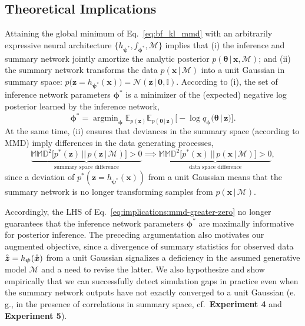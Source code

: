 \documentclass[twoside,11pt]{article}
\newcommand{\observed}[1]{\protect\accentset{\text{o}}{#1}}%
\newcommand{\numberDDM}{4}
\newcommand{\numberCovid}{5}
\newcommand{\x}{\boldsymbol{x}}
\newcommand{\z}{\boldsymbol{z}}
\newcommand{\thetab}{\boldsymbol{\theta}}
\newcommand{\phib}{\boldsymbol{\phi}}
\newcommand{\psib}{\boldsymbol{\psi}}
\newcommand{\0}{\boldsymbol{0}}
\newcommand{\given}{\,|\,}
\newcommand{\M}{\mathcal{M}}
\newcommand{\eg}{e.\,g.}
\DeclareMathOperator*{\argmin}{argmin}
\begin{document}
\subsection{Theoretical Implications}
\label{sec:theoretical-implications}

Attaining the global minimum of Eq.~\ref{eq:bf_kl_mmd} with an arbitrarily expressive neural architecture $\{h_{\psib^*}, f_{\phib^*}, \mathcal{M}\}$ implies that (i) the inference and summary network jointly amortize the analytic posterior $p(\thetab \given \x, \mathcal{M})$; and (ii) the summary network transforms the data $p(\x \given \mathcal{M})$ into a unit Gaussian in summary space: $p\big(\z = h_{\psib^*}(\x)\big) = \mathcal{N}(\z \given \mathbf{0}, \mathbb{I})$.
According to (i), the set of inference network parameters $\phib^*$ is a minimizer of the (expected) negative log posterior learned by the inference network,
\begin{equation}
    \phib^* = \argmin_{\phib}  
    \mathbb{E}_{p(\z)} \mathbb{E}_{p(\thetab \given \z)}\Big[-\log q_{\phib}\big(\thetab\given \z\big)\Big].
\end{equation}
At the same time, (ii) ensures that deviances in the summary space (according to MMD) imply differences in the data generating processes,
\begin{equation}\label{eq:implications:mmd-greater-zero}
    \underbrace{\mathbb{MMD}^2\big[p^*(\z)\,||\,p(\z\given\M)\big] > 0}_{\text{summary space difference}} \implies \underbrace{\mathbb{MMD}^2\big[p^*(\x)\,||\,p(\x \given \mathcal{M})\big] > 0}_{\text{data space difference}},
\end{equation}
since a deviation of $p^*(\z=h_{\psib^*}(\x))$ from a unit Gaussian means that the summary network is no longer transforming samples from $p(\x \given \mathcal{M})$. 

Accordingly, the LHS of Eq.~\ref{eq:implications:mmd-greater-zero} no longer guarantees that the inference network parameters $\phib^*$ are maximally informative for posterior inference. 
The preceding argumentation also motivates our augmented objective, since a divergence of summary statistics for observed data $\observed{\z}=h_{\psib}(\observed{\x})$ from a unit Gaussian signalizes a deficiency in the assumed generative model $\M$ and a need to revise the latter. 
We also hypothesize and show empirically that we can successfully detect simulation gaps in practice even when the summary network outputs have not exactly converged to a unit Gaussian (\eg, in the presence of correlations in summary space, cf.\ \textbf{Experiment \numberDDM} and \textbf{Experiment \numberCovid}).
\end{document}
